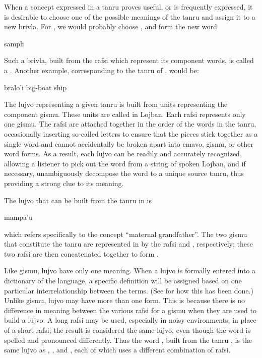 When a concept expressed in a tanru proves useful, or is frequently expressed, it is desirable to choose one of the possible meanings of the tanru and assign it to a new brivla. For , we would probably choose , and form the new word
\begin{example}
sampli
\end{example}

Such a brivla, built from the rafsi which represent its component words, is called a . Another example, corresponding to the tanru of , would be:
\begin{example}
bralo'i\n
big-boat\n
ship
\end{example}

The lujvo representing a given tanru is built from units representing the component gismu. These units are called  in Lojban. Each rafsi represents only one gismu. The rafsi are attached together in the order of the words in the tanru, occasionally inserting so-called  letters to ensure that the pieces stick together as a single word and cannot accidentally be broken apart into cmavo, gismu, or other word forms. As a result, each lujvo can be readily and accurately recognized, allowing a listener to pick out the word from a string of spoken Lojban, and if necessary, unambiguously decompose the word to a unique source tanru, thus providing a strong clue to its meaning. 

The lujvo that can be built from the tanru  in  is
\begin{example}
mampa'u
\end{example}

{\noindent}which refers specifically to the concept ``maternal grandfather''. The two gismu that constitute the tanru are represented in  by the rafsi  and , respectively; these two rafsi are then concatenated together to form . 

Like gismu, lujvo have only one meaning. When a lujvo is formally entered into a dictionary of the language, a specific definition will be assigned based on one particular interrelationship between the terms. (See  for how this has been done.) Unlike gismu, lujvo may have more than one form. This is because there is no difference in meaning between the various rafsi for a gismu when they are used to build a lujvo. A long rafsi may be used, especially in noisy environments, in place of a short rafsi; the result is considered the same lujvo, even though the word is spelled and pronounced differently. Thus the word , built from the tanru , is the same lujvo as , , and , each of which uses a different combination of rafsi.

